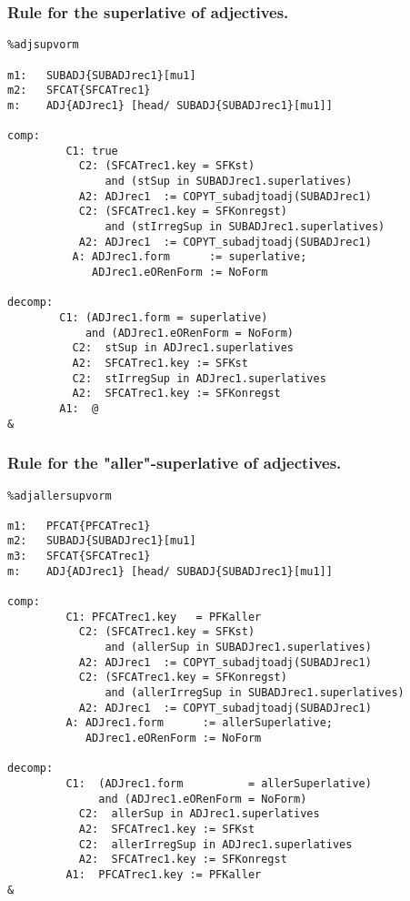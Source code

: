 \subsubsection{Rule for the superlative of adjectives.}
\begin{verbatim}
%adjsupvorm

m1:   SUBADJ{SUBADJrec1}[mu1]
m2:   SFCAT{SFCATrec1}
m:    ADJ{ADJrec1} [head/ SUBADJ{SUBADJrec1}[mu1]]

comp:    
         C1: true
           C2: (SFCATrec1.key = SFKst) 
               and (stSup in SUBADJrec1.superlatives)
           A2: ADJrec1  := COPYT_subadjtoadj(SUBADJrec1)
           C2: (SFCATrec1.key = SFKonregst) 
               and (stIrregSup in SUBADJrec1.superlatives)
           A2: ADJrec1  := COPYT_subadjtoadj(SUBADJrec1)
          A: ADJrec1.form      := superlative;
             ADJrec1.eORenForm := NoForm

decomp:  
        C1: (ADJrec1.form = superlative) 
            and (ADJrec1.eORenForm = NoForm)
          C2:  stSup in ADJrec1.superlatives
          A2:  SFCATrec1.key := SFKst
          C2:  stIrregSup in ADJrec1.superlatives
          A2:  SFCATrec1.key := SFKonregst
        A1:  @
&
\end{verbatim}
\newpage
\subsubsection{Rule for the "aller"-superlative of adjectives.}
\begin{verbatim}
%adjallersupvorm

m1:   PFCAT{PFCATrec1}
m2:   SUBADJ{SUBADJrec1}[mu1]
m3:   SFCAT{SFCATrec1}
m:    ADJ{ADJrec1} [head/ SUBADJ{SUBADJrec1}[mu1]]

comp:    
         C1: PFCATrec1.key   = PFKaller
           C2: (SFCATrec1.key = SFKst) 
               and (allerSup in SUBADJrec1.superlatives)
           A2: ADJrec1  := COPYT_subadjtoadj(SUBADJrec1)
           C2: (SFCATrec1.key = SFKonregst) 
               and (allerIrregSup in SUBADJrec1.superlatives)
           A2: ADJrec1  := COPYT_subadjtoadj(SUBADJrec1)
         A: ADJrec1.form      := allerSuperlative;
            ADJrec1.eORenForm := NoForm

decomp:  
         C1:  (ADJrec1.form          = allerSuperlative) 
              and (ADJrec1.eORenForm = NoForm)
           C2:  allerSup in ADJrec1.superlatives
           A2:  SFCATrec1.key := SFKst
           C2:  allerIrregSup in ADJrec1.superlatives
           A2:  SFCATrec1.key := SFKonregst
         A1:  PFCATrec1.key := PFKaller
&
\end{verbatim}
\newpage
